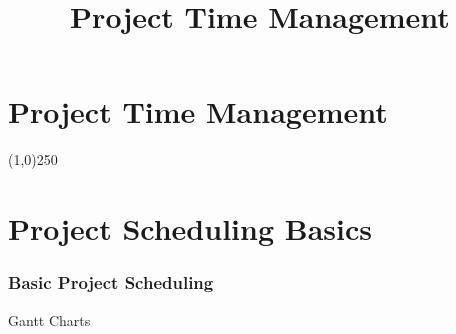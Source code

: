 




\title[Project Management \& BIM]{Project Time Management}



%
\usetikzlibrary{arrows}



\section{Project Time Management}



\tableofcontents
\newpage



\begin{frame}
\titlepage
\end{frame}
\begin{center}\line(1,0){250}\end{center}
%
%

\section{Project Scheduling Basics}


\begin{frame}
	\frametitle{Basic Project Scheduling}
	\begin{block}{Gantt Charts}
		
	\end{block}
\end{frame}





